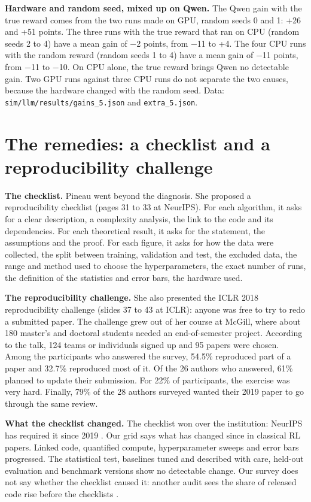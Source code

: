 \documentclass[11pt,a4paper]{article}
\begin{document}
\textbf{Hardware and random seed, mixed up on Qwen.} The Qwen gain with
the true reward comes from the two runs made on GPU, random seeds 0 and
1: +26 and +51 points. The three runs with the true reward that ran on
CPU (random seeds 2 to 4) have a mean gain of −2 points, from −11 to +4.
The four CPU runs with the random reward (random seeds 1 to 4) have a
mean gain of −11 points, from −11 to −10. On CPU alone, the true reward
brings Qwen no detectable gain. Two GPU runs against three CPU runs do
not separate the two causes, because the hardware changed with the
random seed. Data: \texttt{sim/llm/results/gains\_5.json} and
\texttt{extra\_5.json}.

\section{The remedies: a checklist and a reproducibility
challenge}\label{the-remedies-a-checklist-and-a-reproducibility-challenge}

\textbf{The checklist.} Pineau went beyond the diagnosis. She proposed a
reproducibility checklist (pages 31 to 33 at NeurIPS). For each
algorithm, it asks for a clear description, a complexity analysis, the
link to the code and its dependencies. For each theoretical result, it
asks for the statement, the assumptions and the proof. For each figure,
it asks for how the data were collected, the split between training,
validation and test, the excluded data, the range and method used to
choose the hyperparameters, the exact number of runs, the definition of
the statistics and error bars, the hardware used.

\textbf{The reproducibility challenge.} She also presented the ICLR 2018
reproducibility challenge (slides 37 to 43 at ICLR): anyone was free to
try to redo a submitted paper. The challenge grew out of her course at
McGill, where about 180 master's and doctoral students needed an
end-of-semester project. According to the talk, 124 teams or individuals
signed up and 95 papers were chosen. Among the participants who answered
the survey, 54.5\% reproduced part of a paper and 32.7\% reproduced most
of it. Of the 26 authors who answered, 61\% planned to update their
submission. For 22\% of participants, the exercise was very hard.
Finally, 79\% of the 28 authors surveyed wanted their 2019 paper to go
through the same review.

\textbf{What the checklist changed.} The checklist won over the
institution: NeurIPS has required it since 2019
\autocite{pineau2021improving}. Our grid says what has changed since in
classical RL papers. Linked code, quantified compute, hyperparameter
sweeps and error bars progressed. The statistical test, baselines tuned
and described with care, held-out evaluation and benchmark versions show
no detectable change. Our survey does not say whether the checklist
caused it: another audit sees the share of released code rise before the
checklists \autocite{coakley2026shift}.
\end{document}
